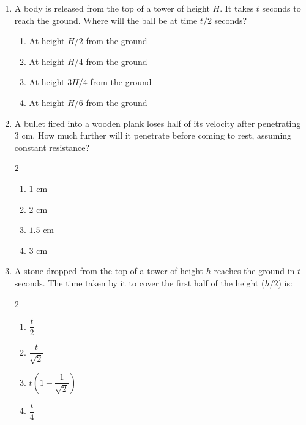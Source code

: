 \documentclass[11pt,a4paper]{article}
\begin{document}
\begin{enumerate}[label=\textbf{\textcolor{l1Green}{Q\arabic*.}},leftmargin=24pt,itemsep=10pt]
  \item A body is released from the top of a tower of height $H$. It takes $t$ seconds to reach the ground. Where will the ball be at time $t/2$ seconds?
  \begin{enumerate}[label=\textbf{\textcolor{primaryDark}{(\Alph*)}},itemsep=2pt]
    \item At height $H/2$ from the ground
    \item At height $H/4$ from the ground
    \item At height $3H/4$ from the ground
    \item At height $H/6$ from the ground
  \end{enumerate}

  \item A bullet fired into a wooden plank loses half of its velocity after penetrating $3\text{ cm}$. How much further will it penetrate before coming to rest, assuming constant resistance?
  \begin{multicols}{2}
  \begin{enumerate}[label=\textbf{\textcolor{primaryDark}{(\Alph*)}},itemsep=2pt]
    \item $1\text{ cm}$
    \item $2\text{ cm}$
    \item $1.5\text{ cm}$
    \item $3\text{ cm}$
  \end{enumerate}
  \end{multicols}

  \item A stone dropped from the top of a tower of height $h$ reaches the ground in $t$ seconds. The time taken by it to cover the first half of the height ($h/2$) is:
  \begin{multicols}{2}
  \begin{enumerate}[label=\textbf{\textcolor{primaryDark}{(\Alph*)}},itemsep=2pt]
    \item $\dfrac{t}{2}$
    \item $\dfrac{t}{\sqrt{2}}$
    \item $t\left(1 - \dfrac{1}{\sqrt{2}}\right)$
    \item $\dfrac{t}{4}$
  \end{enumerate}
  \end{multicols}


\end{enumerate}
\end{document}
